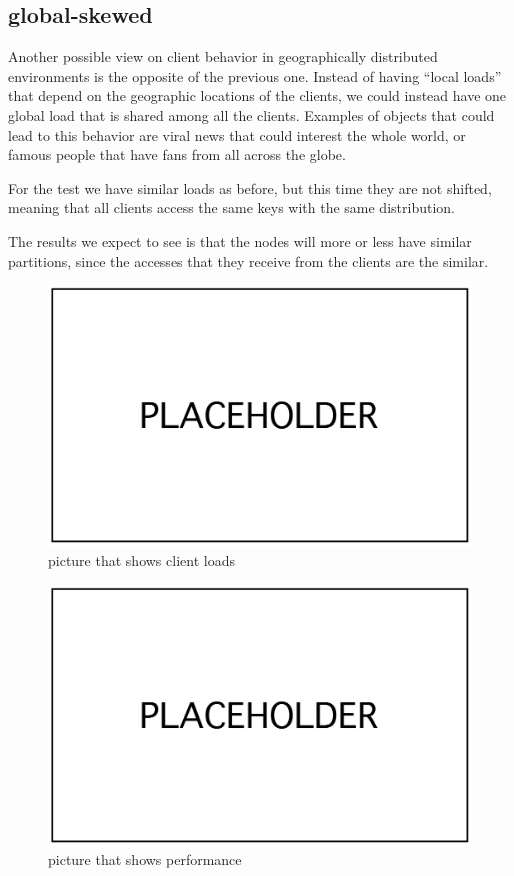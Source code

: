 \subsection{global-skewed}\label{sec:global-skewed}
Another possible view on client behavior in geographically distributed environments is the opposite of the previous one. Instead of having ``local loads'' that depend on the geographic locations of the clients, we could instead have one global load that is shared among all the clients. Examples of objects that could lead to this behavior are viral news that could interest the whole world, or famous people that have fans from all across the globe.

For the test we have similar loads as before, but this time they are not shifted, meaning that all clients access the same keys with the same distribution. 

The results we expect to see is that the nodes will more or less have similar partitions, since the accesses that they receive from the clients are the similar.

\begin{figure}[!htb]
  \centering
  \includegraphics[width=\textwidth,height=\textheight,keepaspectratio]{img/placeholder.png}
  \caption[caption]{ picture that shows client loads }
  \label{fig:global-skewed-loads}
\end{figure}

\begin{figure}[!htb]
  \centering
  \includegraphics[width=\textwidth,height=\textheight,keepaspectratio]{img/placeholder.png}
  \caption[caption]{ picture that shows performance }
  \label{fig:global-skewed-performance}
\end{figure}

